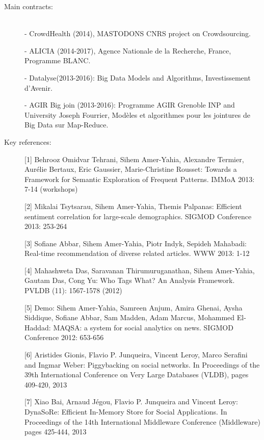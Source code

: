 \begin{description}

\item[Main contracts:]  \ \\
- CrowdHealth (2014), MASTODONS CNRS project on Crowdsourcing. 

- ALICIA (2014-2017), Agence Nationale de la Recherche, France, Programme BLANC. 

- Datalyse(2013-2016): Big Data Models and Algorithms, Investissement d'Avenir.


- AGIR Big join (2013-2016): Programme AGIR Grenoble INP and  University Joseph Fourrier,  Mod{\`e}les et algorithmes pour les jointures de Big Data sur Map-Reduce. 
  
\item[Key references:]

[1]   Behrooz Omidvar Tehrani, Sihem Amer-Yahia, Alexandre Termier, Aur{\'e}lie Bertaux, Eric Gaussier, Marie-Christine Rousset: Towards a Framework for Semantic Exploration of Frequent Patterns. IMMoA 2013: 7-14 (workshops) 

[2]  Mikalai Tsytsarau, Sihem Amer-Yahia, Themis Palpanas: Efficient sentiment correlation for large-scale demographics. SIGMOD Conference 2013: 253-264

[3]  Sofiane Abbar, Sihem Amer-Yahia, Piotr Indyk, Sepideh Mahabadi: Real-time recommendation of diverse related articles. WWW 2013: 1-12

[4]  Mahashweta Das, Saravanan Thirumuruganathan, Sihem Amer-Yahia, Gautam Das, Cong Yu: Who Tags What? An Analysis Framework. PVLDB (11): 1567-1578 (2012)

[5]  Demo: Sihem Amer-Yahia, Samreen Anjum, Amira Ghenai, Aysha Siddique, Sofiane Abbar, Sam Madden, Adam Marcus, Mohammed El-Haddad: MAQSA: a system for social analytics on news. SIGMOD Conference 2012: 653-656

[6] Aristides Gionis, Flavio P. Junqueira, Vincent Leroy, Marco Serafini and Ingmar Weber: Piggybacking on social networks. In Proceedings of the 39th International Conference on Very Large Databases (VLDB), pages 409-420, 2013

[7]  Xiao Bai, Arnaud J{\'e}gou, Flavio P. Junqueira and Vincent Leroy:  DynaSoRe: Efficient In-Memory Store for Social Applications. In Proceedings of the 14th International Middleware Conference (Middleware)  pages 425-444, 2013

\end{description}

